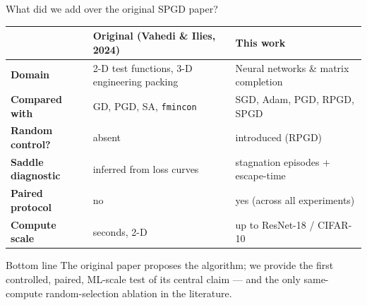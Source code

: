 \documentclass[11pt,aspectratio=169]{beamer}
\begin{document}
\begin{frame}{What did we add over the original SPGD paper?}
  \footnotesize
  \begin{tabular}{>{\bfseries}l p{} p{}}
    \toprule
     & \textbf{Original (Vahedi \& Ilies, 2024)} & \textbf{This work} \\
    \midrule
    Domain     & 2-D test functions, 3-D engineering packing &
                 Neural networks \& matrix completion \\
    Compared with & GD, PGD, SA, \texttt{fmincon} &
                 SGD, Adam, PGD, \alert{RPGD}, SPGD \\
    Random control? & \alert{absent} & \alert{introduced (RPGD)} \\
    Saddle diagnostic & inferred from loss curves &
                 \alert{stagnation episodes + escape-time} \\
    Paired protocol & no & \alert{yes (across all experiments)} \\
    Compute scale & seconds, 2-D & up to ResNet-18 / CIFAR-10 \\
    \bottomrule
  \end{tabular}

  \vspace{0.7em}
  \begin{block}{Bottom line}
    The original paper proposes the algorithm; we provide the first
    \alert{controlled, paired, ML-scale} test of its central claim
    --- and the only same-compute random-selection ablation in the literature.
  \end{block}
\end{frame}
\end{document}
